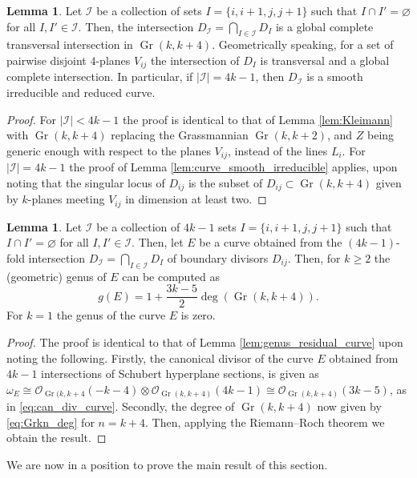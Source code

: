 \documentclass[12pt]{extarticle}
\theoremstyle{definition}
\theoremstyle{theorem}
\newtheorem{lemma}[definition]{Lemma}
\theoremstyle{remark}
\numberwithin{equation}{section}
\DeclareMathOperator{\gr}{Gr}
\newcommand{\grk}{\operatorname{Gr}(k,k+2)}
\begin{document}
\begin{lemma}\label{lem:m=4_Kleimann}
    Let $\mathcal{I}$ be a collection of sets $I=\{i,i+1,j,j+1\}$ such that $I\cap I'=\varnothing$ for all $I,I'\in \mathcal{I}$.
    Then, the intersection $D_\mathcal{I}=\bigcap_{I\in \mathcal{I}}D_I$ is a global complete transversal intersection in $\gr(k,k+4)$.
    Geometrically speaking, for a set of pairwise disjoint $4$-planes $V_{ij}$ the intersection of $D_{I}$ is transversal and a global complete intersection.
    In particular, if $|\mathcal{I}|=4k-1$, then $D_\mathcal{I}$ is a smooth irreducible and reduced curve.
\end{lemma}
\begin{proof}
    For $|\mathcal{I}|<4k-1$ the proof is identical to that of Lemma \ref{lem:Kleimann} with $\gr(k,k+4)$ replacing the Grassmannian $\grk$, and $Z$ being generic enough with respect to the planes $V_{ij}$, instead of the lines $L_i$.
    For $|\mathcal{I}|=4k-1$ the proof of Lemma \ref{lem:curve_smooth_irreducible} applies, upon noting that the singular locus of $D_{ij}$ is the subset of $D_{ij}\subset\gr(k,k+4)$ given by $k$-planes meeting $V_{ij}$ in dimension at least two.
\end{proof}

\begin{lemma}\label{lem:m=4_genus_residual_curve}
    Let $\mathcal{I}$ be a collection of $4k-1$ sets $I=\{i,i+1,j,j+1\}$ such that $I\cap I'=\varnothing$ for all $I,I'\in \mathcal{I}$.
    Then, let $E$ be a curve obtained from the $(4k-1)$-fold intersection $D_{\mathcal{I}}=\bigcap_{I\in \mathcal{I}}D_I$ of boundary divisors $D_{ij}$.
    Then, for $k\geq 2$ the (geometric) genus of $E$  can be computed as 
    \[
    g(E)=1+\frac{3k-5}{2}\deg(\gr(k,k+4)).
    \]
    For $k=1$ the genus of the curve $E$ is zero.
\end{lemma}
\begin{proof}
    The proof is identical to that of Lemma \ref{lem:genus_residual_curve} upon noting the following.
    Firstly, the canonical divisor of the curve $E$ obtained from $4k-1$ intersections of Schubert hyperplane sections, is given as $\omega_E\cong \mathcal{O}_{\gr(k,k+4}(-k-4)\otimes \mathcal{O}_{\gr(k,k+4)}(4k-1)\cong \mathcal{O}_{\gr(k,k+4)}(3k-5)$, as in \eqref{eq:can_div_curve}.
    Secondly, the degree of $\gr(k,k+4)$ now given by \eqref{eq:Grkn_deg} for $n=k+4$.
    Then, applying the Riemann--Roch theorem we obtain the result.
\end{proof}

We are now in a position to prove the main result of this section.
\end{document}
